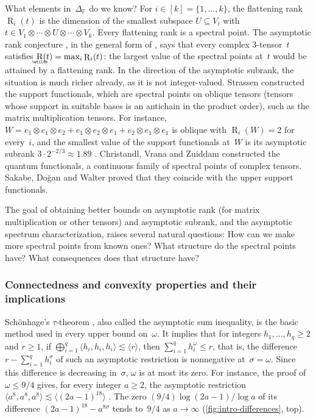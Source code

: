 \documentclass[11pt,letterpaper]{article}
\DeclareMathOperator{\asymprank}{\underaccent{\wtilde}{R}}
\DeclareMathOperator{\tensorrank}{R}
\newcommand{\FF}{\mathbb{F}}
\newcommand{\asympleq}{\lesssim}
\begin{document}
What elements in~$\Delta_\FF$ do we know? For \(i\in[k]=\{1,\ldots,k\}\), the flattening rank~\(\tensorrank_i(t)\) is the dimension of the smallest subspace \(U\subseteq V_i\) with \(t\in V_1\otimes\cdots\otimes U\otimes\cdots\otimes V_k\). Every flattening rank is a spectral point. The asymptotic rank conjecture \cite{MR1341854}, in the general form of \cite[Problem~15.5]{burgisser1997algebraic}, says that every complex \(3\)-tensor~\(t\) satisfies \(\asymprank(t)=\max_i\tensorrank_i(t)\): the largest value of the spectral points at~\(t\) would be attained by a flattening rank. 
In the direction of the asymptotic subrank, the situation is much richer already, as it is not integer-valued. Strassen \cite{strassen1991degeneration} constructed the support functionals, which are spectral points on oblique tensors (tensors whose support in suitable bases is an antichain in the product order), such as the matrix multiplication tensors. For instance, \(W=e_1\otimes e_1\otimes e_2+e_1\otimes e_2\otimes e_1+e_2\otimes e_1\otimes e_1\) is oblique with \(\tensorrank_i(W)=2\) for every~\(i\), and the smallest value of the support functionals at~\(W\) is its asymptotic subrank \(3\cdot2^{-2/3}\approx1.89\) \cite[Theorem~6.7]{strassen1991degeneration}. 
Christandl, Vrana and Zuiddam \cite{MR4495838} constructed the quantum functionals, a continuous family of spectral points of complex tensors. Sakabe, Do\u{g}an and Walter \cite{sakabe2026strassenssupportfunctionalscoincide} proved that they coincide with the upper support functionals. 

The goal of obtaining better bounds on asymptotic rank (for matrix multiplication or other tensors) and asymptotic subrank, and the asymptotic spectrum characterization, raises several natural questions: How can we make more spectral points from known ones? What structure do the spectral points have? What consequences does that structure have?

\subsubsection*{Connectedness and convexity properties and their implications}

Schönhage's \(\tau\)-theorem \cite{MR623057}, also called the asymptotic sum inequality, is the basic method used in every upper bound on~\(\omega\). It implies that for integers \(h_1,\ldots,h_q\geq2\) and \(r\geq1\), if \(\bigoplus_{i=1}^q\langle h_i,h_i,h_i\rangle\asympleq\langle r\rangle\), then \(\sum_{i=1}^qh_i^\omega\leq r\), that is, the difference \(r-\sum_{i=1}^qh_i^\sigma\) of such an asymptotic restriction is nonnegative at~\(\sigma=\omega\). Since this difference is decreasing in~\(\sigma\), \(\omega\) is at most its zero. For instance, the proof of \(\omega\leq9/4\) \cite{OAI:Matrix-Multiplication-Nine-Fourths-October-2-2026} gives, for every integer \(a\geq2\), the asymptotic restriction \(\langle a^8,a^8,a^8\rangle\asympleq\langle(2a-1)^{18}\rangle\) \cite{amanov2026multiplyingmatricespolynomialsexposition}. The zero \((9/4)\log(2a-1)/\log a\) of its difference \((2a-1)^{18}-a^{8\sigma}\) tends to~\(9/4\) as \(a\to\infty\) (\cref{fig:intro-differences}, top).
\end{document}
